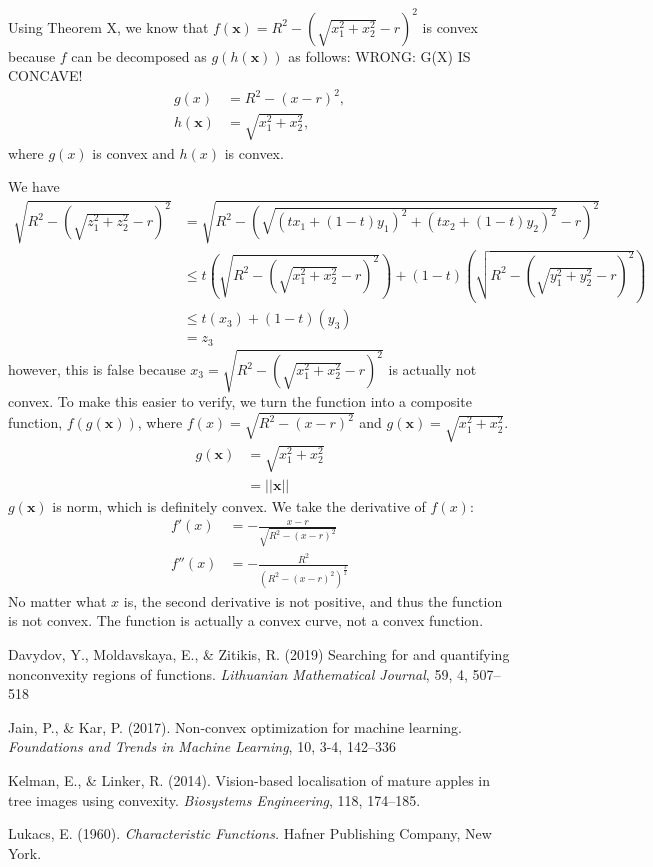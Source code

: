 \documentclass[12pt]{article}
\numberwithin{equation}{section}
\numberwithin{figure}{section}
\numberwithin{table}{section}
\theoremstyle{definition}
\theoremstyle{remark}
\numberwithin{equation}{section}
\begin{document}
Using Theorem X, we know that $f(\mathbf{x}) = R^{2} - (\sqrt{x_{1}^{2} + x_{2}^{2}} - r)^{2}$ is convex because $f$ can be decomposed as $g(h(\mathbf{x}))$ as follows:
WRONG: G(X) IS CONCAVE!
\begin{align*}
	g(x) 
	&= R^{2} - (x - r)^{2},
	\\
	h(\mathbf{x})
	&= \sqrt{x_{1}^{2} + x_{2}^{2}},
\end{align*}
where $g(x)$ is convex and $h(x)$ is convex.

We have 
\begin{align*}
	\sqrt{R^{2} - (\sqrt{z_{1}^{2} + z_{2}^{2}} - r)^{2}}
	&= \sqrt{R^{2} - (\sqrt{(tx_{1} + (1 - t)y_{1})^{2} + (tx_{2} + (1  - t)y_{2})^{2}} - r)^{2}}
	\\
	&\leq t(\sqrt{R^{2} - (\sqrt{x_{1}^{2} + x_{2}^{2}} - r)^{2}} ) + (1-t)(\sqrt{R^{2} - (\sqrt{y_{1}^{2} + y_{2}^{2}} - r)^{2}})
	\\
	&\leq t(x_{3}) + (1 - t)(y_{3})
	\\
	&= z_{3}
\end{align*}
however, this is false because $x_{3} = \sqrt{R^{2}-(\sqrt{x_{1}^{2}+x_{2}^{2}} - r)^{2}}$ is actually not convex. To make this easier to verify, we turn the function into a composite function, $f(g(\mathbf{x}))$, where $f(x) = \sqrt{R^{2}-(x - r)^{2}}$ and $g(\mathbf{x}) = \sqrt{x_{1}^{2}+x_{2}^{2}}$.
\begin{align*}
	g(\mathbf{x})
	&= \sqrt{x_{1}^{2}+x_{2}^{2}}
	\\
	&= ||\mathbf{x}||
\end{align*}
$g(\mathbf{x})$ is norm, which is definitely convex. We take the derivative of $f(x)$:
\begin{align*}
	f'(x)
	&= - \frac{x - r}{\sqrt{R^{2} - (x - r)^{2}}}
	\\
	f''(x)
	&= - \frac{R^{2}}{(R^{2} - (x - r)^{2})^{\frac{3}{2}}}
\end{align*}
No matter what $x$ is, the second derivative is not positive, and thus the function is not convex. The function is actually a convex curve, not a convex function.


\begin{thebibliography}{}

	Davydov, Y., Moldavskaya, E., \& Zitikis, R. (2019)
	Searching for and quantifying nonconvexity regions of functions.
	\textit{Lithuanian Mathematical Journal}, 59, 4, 507--518

	Jain, P., \& Kar, P. (2017).
	Non-convex optimization for machine learning.
	\textit{Foundations and Trends in Machine Learning}, 10, 3-4, 142--336

	Kelman, E., \& Linker, R. (2014).
	Vision-based localisation of mature apples in tree images using convexity.
	\textit{Biosystems Engineering}, 118, 174--185.

	Lukacs, E. (1960). 
	\textit{Characteristic Functions.} Hafner Publishing Company, New York. 

\end{thebibliography}
\end{document}
